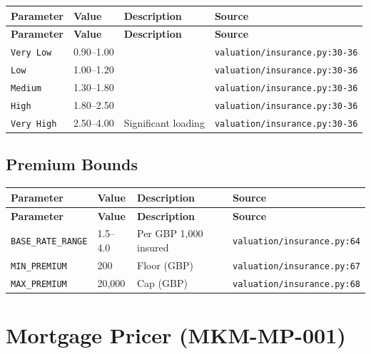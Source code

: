 \documentclass[11pt,a4paper]{article}
\begin{document}
\begin{longtable}{p{4cm}p{4cm}p{5.5cm}p{3.5cm}}
    \toprule
    \textbf{Parameter} & \textbf{Value} & \textbf{Description} & \textbf{Source} \\
    \midrule
    \endfirsthead
    \toprule
    \textbf{Parameter} & \textbf{Value} & \textbf{Description} & \textbf{Source} \\
    \midrule
    \endhead
    \bottomrule
    \endfoot
    \texttt{Very Low} & 0.90--1.00 &  & {\scriptsize \texttt{valuation/insurance.py:30-36}} \\
    \texttt{Low} & 1.00--1.20 &  & {\scriptsize \texttt{valuation/insurance.py:30-36}} \\
    \texttt{Medium} & 1.30--1.80 &  & {\scriptsize \texttt{valuation/insurance.py:30-36}} \\
    \texttt{High} & 1.80--2.50 &  & {\scriptsize \texttt{valuation/insurance.py:30-36}} \\
    \texttt{Very High} & 2.50--4.00 & Significant loading & {\scriptsize \texttt{valuation/insurance.py:30-36}} \\
\end{longtable}

\subsection{Premium Bounds}

\begin{longtable}{p{4cm}p{4cm}p{5.5cm}p{3.5cm}}
    \toprule
    \textbf{Parameter} & \textbf{Value} & \textbf{Description} & \textbf{Source} \\
    \midrule
    \endfirsthead
    \toprule
    \textbf{Parameter} & \textbf{Value} & \textbf{Description} & \textbf{Source} \\
    \midrule
    \endhead
    \bottomrule
    \endfoot
    \texttt{BASE\_RATE\_RANGE} & 1.5--4.0 & Per GBP 1,000 insured & {\scriptsize \texttt{valuation/insurance.py:64}} \\
    \texttt{MIN\_PREMIUM} & 200 & Floor (GBP) & {\scriptsize \texttt{valuation/insurance.py:67}} \\
    \texttt{MAX\_PREMIUM} & 20,000 & Cap (GBP) & {\scriptsize \texttt{valuation/insurance.py:68}} \\
\end{longtable}

\clearpage

\section{Mortgage Pricer (MKM-MP-001)}
\end{document}

